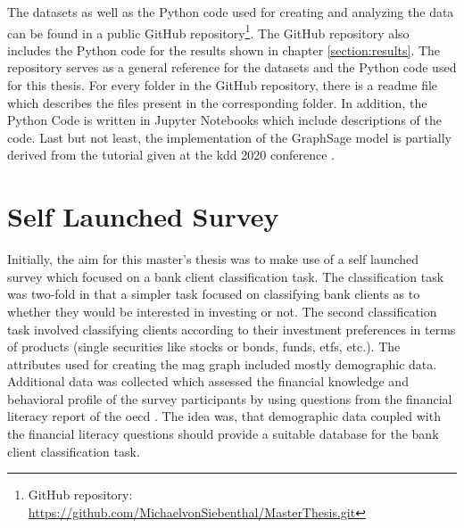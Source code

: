   \noindent The datasets as well as the Python code used for creating and 
  analyzing the data can be found in a public GitHub repository\footnote{GitHub
  repository: \url{https://github.com/MichaelvonSiebenthal/MasterThesis.git}}. 
  The GitHub repository also includes the Python code for the results shown in
  chapter \ref{section:results}. The repository serves as a general reference 
  for the datasets and the Python code used for this thesis. For every folder 
  in the GitHub repository, there is a readme file  which describes the files 
  present in the corresponding folder. In addition, the Python Code is written 
  in Jupyter Notebooks which include descriptions of the code. Last but not
  least, the implementation of the GraphSage model is partially derived from 
  the tutorial given at the \acs{kdd} 2020 conference \citep{kdd2020}.

  \section{Self Launched Survey}
  \label{section:self_survey} 

  Initially, the aim for this master's thesis was to make use of a self launched 
  survey which focused on a bank client classification task. The classification 
  task was two-fold in that a simpler task focused on classifying bank clients 
  as to whether they would be interested in investing or not. The second 
  classification task involved classifying clients according to their 
  investment preferences in terms of products (single securities like stocks or 
  bonds, funds, \acsp{etf}, etc.). The attributes used for creating the
  \acs{mag} graph included mostly demographic data. Additional data was 
  collected which assessed the financial knowledge and behavioral profile of 
  the survey participants by using questions from the financial literacy report 
  of the \acs{oecd} \citeyearpar{OECD2017}. The idea was, that demographic data 
  coupled with the financial literacy questions should provide a suitable 
  database for the bank client classification task. \\

